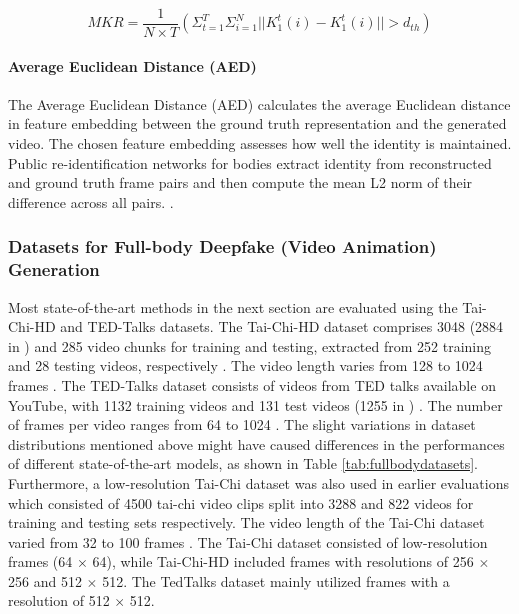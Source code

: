 \begin{equation}
    MKR = \frac{1}{N \times T} (\Sigma_{t=1}^T \Sigma_{i=1}^N ||K_1^t(i) - K_1^t(i) || > d_{th})
    \label{eq:fullbody_mkr}
\end{equation}

\paragraph{Average Euclidean Distance (AED)}

The Average Euclidean Distance (AED) calculates the average Euclidean distance in feature embedding between the ground truth representation and the generated video. The chosen feature embedding assesses how well the identity is maintained. Public re-identification networks for bodies extract identity from reconstructed and ground truth frame pairs and then compute the mean L2 norm of their difference across all pairs. \cite{siarohin2021motion}.

\subsubsection{Datasets for Full-body Deepfake (Video Animation) Generation}

Most state-of-the-art methods in the next section are evaluated using the Tai-Chi-HD and TED-Talks datasets. The Tai-Chi-HD dataset comprises 3048 (2884 in \cite{guo2024human}) and 285 video chunks for training and testing, extracted from 252 training and 28 testing videos, respectively \cite{hong2022qs, siarohin2019first}. The video length varies from 128 to 1024 frames \cite{siarohin2019first}. The TED-Talks dataset consists of videos from TED talks available on YouTube, with 1132 training videos and 131 test videos (1255 in \cite{tao2022motion}) \cite{guo2024human}. The number of frames per video ranges from 64 to 1024 \cite{guo2024human, zhao2022thin, siarohin2021motion}. The slight variations in dataset distributions mentioned above might have caused differences in the performances of different state-of-the-art models, as shown in Table \ref{tab:fullbodydatasets}. Furthermore, a low-resolution Tai-Chi dataset \cite{tulyakov2018mocogan} was also used in earlier evaluations which consisted of 4500 tai-chi video clips split into 3288 and 822 videos for training and testing sets respectively. The video length of the Tai-Chi dataset varied from 32 to 100 frames \cite{siarohin2019animating}. The Tai-Chi dataset consisted of low-resolution frames (64 $\times$ 64), while Tai-Chi-HD included frames with resolutions of 256 $\times$ 256 and 512 $\times$ 512. The TedTalks dataset mainly utilized frames with a resolution of 512 $\times$ 512.

